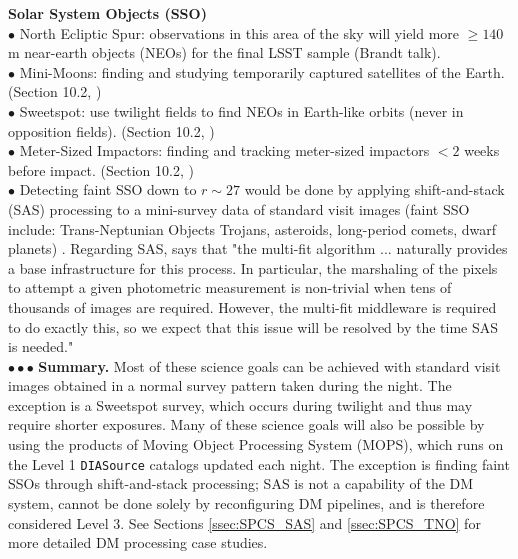 \documentclass[DM,lsstdraft,toc]{lsstdoc}
\begin{document}
\medskip
\noindent \textbf{Solar System Objects (SSO)}\\
$\bullet$ North Ecliptic Spur: observations in this area of the sky will yield more $\geq140$ m near-earth objects (NEOs) for the final LSST sample (Brandt talk). \\
$\bullet$ Mini-Moons: finding and studying temporarily captured satellites of the Earth. (Section 10.2, \citep{2017arXiv170804058L}) \\
$\bullet$ Sweetspot: use twilight fields to find NEOs in Earth-like orbits (never in opposition fields). (Section 10.2, \citep{2017arXiv170804058L}) \\
$\bullet$ Meter-Sized Impactors: finding and tracking meter-sized impactors $<2$ weeks before impact.  (Section 10.2, \citep{2017arXiv170804058L}) \\
$\bullet$ Detecting faint SSO down to $r\sim27$ would be done by applying shift-and-stack (SAS) processing to a mini-survey data of standard visit images (faint SSO include: Trans-Neptunian Objects Trojans, asteroids, long-period comets, dwarf planets) . Regarding SAS,  says that "the multi-fit algorithm ... naturally provides a base infrastructure for this process. In particular, the marshaling of the pixels to attempt a given photometric measurement is non-trivial when tens of thousands of images are required. However, the multi-fit middleware is required to do exactly this, so we expect that this issue will be resolved by the time SAS is needed." \\
$\bullet \bullet \bullet$ \textbf{Summary.} Most of these science goals can be achieved with standard visit images obtained in a normal survey pattern taken during the night. The exception is a Sweetspot survey, which occurs during twilight and thus may require shorter exposures. Many of these science goals will also be possible by using the products of Moving Object Processing System (MOPS), which runs on the Level 1 \texttt{DIASource} catalogs updated each night. The exception is finding faint SSOs through shift-and-stack processing; SAS is not a capability of the DM system, cannot be done solely by reconfiguring DM pipelines, and is therefore considered Level 3. See Sections \ref{ssec:SPCS_SAS} and \ref{ssec:SPCS_TNO} for more detailed DM processing case studies.
\end{document}
